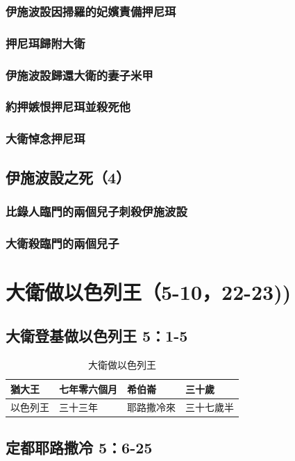 \subsubsection{伊施波設因掃羅的妃嬪責備押尼珥}
\subsubsection{押尼珥歸附大衛}
\subsubsection{伊施波設歸還大衛的妻子米甲}
\subsubsection{約押嫉恨押尼珥並殺死他}
\subsubsection{大衛悼念押尼珥}

\subsection{伊施波設之死（4）}
\subsubsection{比錄人臨門的兩個兒子刺殺伊施波設}
\subsubsection{大衛殺臨門的兩個兒子}

\section{大衛做以色列王（5-10，22-23))}
\subsection{大衛登基做以色列王 5：1-5}
\begin{table}[!hbp]
\centering 
\begin{tabular}{|p{}|p{}|p{}|p{}|}
\hline
\hline
猶大王&七年零六個月 & 希伯崙& 三十歲\\\hline
以色列王&三十三年&耶路撒冷來& 三十七歲半\\\hline
\end{tabular}
\caption{大衛做以色列王}
\end{table}

\subsection{定都耶路撒冷 5：6-25}


